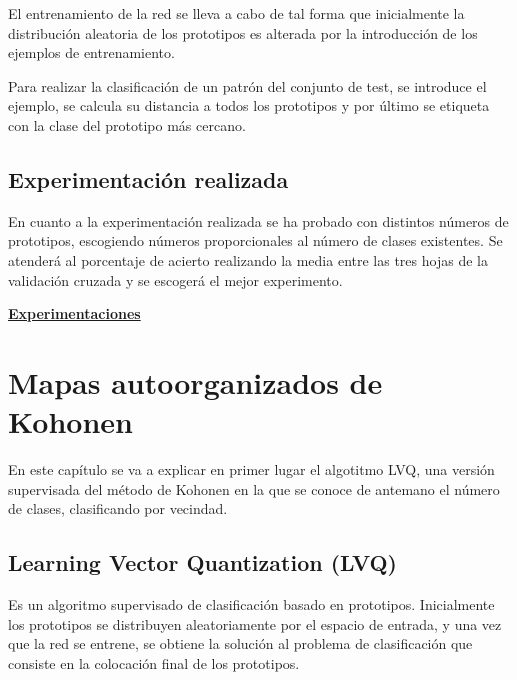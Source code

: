 \documentclass[11pt,spanish,listoffigures,listoftables]{workluis}
\begin{document}
\par El entrenamiento de la red se lleva a cabo de tal forma que inicialmente la distribución aleatoria de los prototipos es alterada por la introducción de los ejemplos de entrenamiento.

\par Para realizar la clasificación de un patrón del conjunto de test, se introduce el ejemplo, se calcula su distancia a todos los prototipos y por último se etiqueta con la clase del prototipo más cercano.

\section{Experimentación realizada}

\par En cuanto a la experimentación realizada se ha probado con distintos números de prototipos, escogiendo números proporcionales al número de clases existentes. Se atenderá al porcentaje de acierto realizando la media entre las tres hojas de la validación cruzada y se escogerá el mejor experimento.

\par \underline{\textbf{Experimentaciones}}








\chapter{Mapas autoorganizados de Kohonen}

\par En este capítulo se va a explicar en primer lugar el algotitmo LVQ, una versión supervisada del método de Kohonen en la que se conoce de antemano el número de clases, clasificando por vecindad.

\section{Learning Vector Quantization (LVQ)}

\par Es un algoritmo supervisado de clasificación basado en prototipos. Inicialmente los prototipos se distribuyen aleatoriamente por el espacio de entrada, y una vez que la red se entrene, se obtiene la solución al problema de clasificación que consiste en la colocación final de los prototipos.
\end{document}
